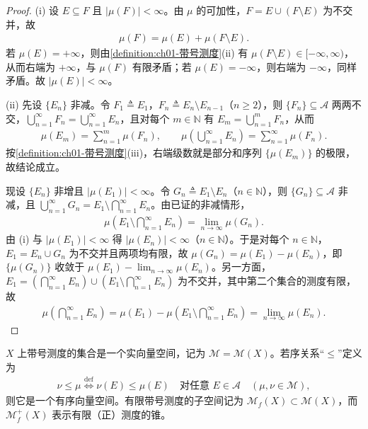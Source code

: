 \documentclass[../../main.tex]{subfiles}%
\begin{document}
\begin{proof}
(i) 设 $E\subseteq F$ 且 $|\mu(F)|<\infty$。由 $\mu$ 的可加性，$F=E\cup(F\setminus E)$ 为不交并，故
\begin{align*}
\mu(F)=\mu(E)+\mu(F\setminus E).
\end{align*}
若 $\mu(E)=+\infty$，则由\cref{definition:ch01-带号测度}(ii) 有 $\mu(F\setminus E)\in[-\infty,\infty)$，从而右端为 $+\infty$，与 $\mu(F)$ 有限矛盾；若 $\mu(E)=-\infty$，则右端为 $-\infty$，同样矛盾。故 $|\mu(E)|<\infty$。

(ii) 先设 $\{E_n\}$ 非减。令 $F_1\triangleq E_1$，$F_n\triangleq E_n\setminus E_{n-1}$（$n\geqslant2$），则 $\{F_n\}\subseteq\mathcal{A}$ 两两不交，$\bigcup_{n=1}^\infty F_n=\bigcup_{n=1}^\infty E_n$，且对每个 $m\in\mathbb{N}$ 有 $E_m=\bigcup_{n=1}^m F_n$，从而
\begin{align*}
\mu(E_m)=\sum_{n=1}^m\mu(F_n),\qquad
\mu\left(\bigcup_{n=1}^\infty E_n\right)=\sum_{n=1}^\infty\mu(F_n).
\end{align*}
按\cref{definition:ch01-带号测度}(iii)，右端级数就是部分和序列 $\{\mu(E_m)\}$ 的极限，故结论成立。

现设 $\{E_n\}$ 非增且 $|\mu(E_1)|<\infty$。令 $G_n\triangleq E_1\setminus E_n$（$n\in\mathbb{N}$），则 $\{G_n\}\subseteq\mathcal{A}$ 非减，且 $\bigcup_{n=1}^\infty G_n=E_1\setminus\bigcap_{n=1}^\infty E_n$。由已证的非减情形，
\begin{align*}
\mu\left(E_1\setminus\bigcap_{n=1}^\infty E_n\right)=\lim_{n\to\infty}\mu(G_n).
\end{align*}
由 (i) 与 $|\mu(E_1)|<\infty$ 得 $|\mu(E_n)|<\infty$（$n\in\mathbb{N}$）。于是对每个 $n\in\mathbb{N}$，$E_1=E_n\cup G_n$ 为不交并且两项均有限，故 $\mu(G_n)=\mu(E_1)-\mu(E_n)$，即 $\{\mu(G_n)\}$ 收敛于 $\mu(E_1)-\lim_{n\to\infty}\mu(E_n)$。另一方面，$E_1=\left(\bigcap_{n=1}^\infty E_n\right)\cup\left(E_1\setminus\bigcap_{n=1}^\infty E_n\right)$ 为不交并，其中第二个集合的测度有限，故
\begin{align*}
\mu\left(\bigcap_{n=1}^\infty E_n\right)=\mu(E_1)-\mu\left(E_1\setminus\bigcap_{n=1}^\infty E_n\right)=\lim_{n\to\infty}\mu(E_n).
\end{align*}
\end{proof}

$X$ 上带号测度的集合是一个实向量空间，记为 $\mathcal{M}=\mathcal{M}(X)$。若序关系“$\leqslant$”定义为
\begin{align*}
\nu\leqslant\mu\overset{\mathrm{def}}{\Longleftrightarrow}\nu(E)\leqslant\mu(E)\quad\text{对任意 }E\in\mathcal{A}\quad(\mu,\nu\in\mathcal{M}),
\end{align*}
则它是一个有序向量空间。有限带号测度的子空间记为 $\mathcal{M}_f(X)\subset\mathcal{M}(X)$，而 $\mathcal{M}_f^+(X)$ 表示有限（正）测度的锥。
\end{document}
